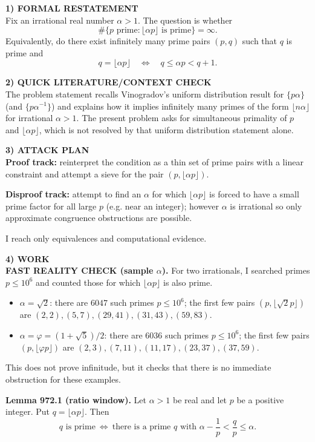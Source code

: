 \medskip
\noindent\textbf{1) FORMAL RESTATEMENT}\\
Fix an irrational real number $\alpha>1$.
The question is whether
\[
\#\{p\text{ prime}: \lfloor \alpha p\rfloor\text{ is prime}\}=\infty.
\]
Equivalently, do there exist infinitely many prime pairs $(p,q)$ such that $q$ is prime and
\[
 q=\lfloor \alpha p\rfloor \quad\Longleftrightarrow\quad q\le \alpha p<q+1.
\]

\medskip
\noindent\textbf{2) QUICK LITERATURE/CONTEXT CHECK}\\
The problem statement recalls Vinogradov's uniform distribution result for $\{p\alpha\}$ (and $\{p\alpha^{-1}\}$) and explains how it implies infinitely many primes of the form $\lfloor n\alpha\rfloor$ for irrational $\alpha>1$.  The present problem asks for simultaneous primality of $p$ and $\lfloor \alpha p\rfloor$, which is not resolved by that uniform distribution statement alone.

\medskip
\noindent\textbf{3) ATTACK PLAN}\\
\textbf{Proof track:} reinterpret the condition as a thin set of prime pairs with a linear constraint and attempt a sieve for the pair $(p,\lfloor\alpha p\rfloor)$.

\textbf{Disproof track:} attempt to find an $\alpha$ for which $\lfloor\alpha p\rfloor$ is forced to have a small prime factor for all large $p$ (e.g. near an integer); however $\alpha$ is irrational so only approximate congruence obstructions are possible.

I reach only equivalences and computational evidence.

\medskip
\noindent\textbf{4) WORK}\\
\textbf{FAST REALITY CHECK (sample $\alpha$).} For two irrationals, I searched primes $p\le 10^6$ and counted those for which $\lfloor \alpha p\rfloor$ is also prime.
\begin{itemize}
\item $\alpha=\sqrt2$: there are $6047$ such primes $p\le 10^6$; the first few pairs $(p,\lfloor\sqrt2 p\rfloor)$ are $(2,2),(5,7),(29,41),(31,43),(59,83)$.
\item $\alpha=\varphi=(1+\sqrt5)/2$: there are $6036$ such primes $p\le 10^6$; the first few pairs $(p,\lfloor\varphi p\rfloor)$ are $(2,3),(7,11),(11,17),(23,37),(37,59)$.
\end{itemize}
This does not prove infinitude, but it checks that there is no immediate obstruction for these examples.

\medskip
\noindent\textbf{Lemma 972.1 (ratio window).}\label{lem:972-ratio}
Let $\alpha>1$ be real and let $p$ be a positive integer.  Put $q=\lfloor \alpha p\rfloor$.
Then
\[
 q\text{ is prime}\ \Longleftrightarrow\ \text{there is a prime }q\text{ with }\alpha-\frac1p<\frac{q}{p}\le \alpha.
\]

